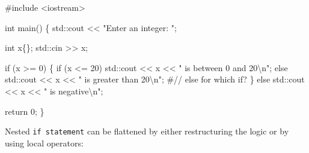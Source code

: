 \documentclass[
  letterpaper,
  DIV=11,
  numbers=noendperiod]{scrreprt}
\newenvironment{Shaded}{\begin{snugshade}}{\end{snugshade}}
\newcommand{\CommentTok}[1]{\textcolor[rgb]{0.37,0.37,0.37}{#1}}
\newcommand{\ControlFlowTok}[1]{\textcolor[rgb]{0.00,0.23,0.31}{#1}}
\newcommand{\DecValTok}[1]{\textcolor[rgb]{0.68,0.00,0.00}{#1}}
\newcommand{\ErrorTok}[1]{\textcolor[rgb]{0.68,0.00,0.00}{#1}}
\newcommand{\FunctionTok}[1]{\textcolor[rgb]{0.28,0.35,0.67}{#1}}
\newcommand{\NormalTok}[1]{\textcolor[rgb]{0.00,0.23,0.31}{#1}}
\newcommand{\SpecialCharTok}[1]{\textcolor[rgb]{0.37,0.37,0.37}{#1}}
\newcommand{\StringTok}[1]{\textcolor[rgb]{0.13,0.47,0.30}{#1}}
\begin{document}
\begin{Shaded}
\begin{Highlighting}[]
\CommentTok{\#include \textless{}iostream\textgreater{}}

\NormalTok{int }\FunctionTok{main}\NormalTok{()}
\NormalTok{\{}
\NormalTok{    std}\SpecialCharTok{::}\NormalTok{cout }\SpecialCharTok{\textless{}}\ErrorTok{\textless{}} \StringTok{"Enter an integer: "}\NormalTok{;}

\NormalTok{    int x\{\};}
\NormalTok{    std}\SpecialCharTok{::}\NormalTok{cin }\SpecialCharTok{\textgreater{}}\ErrorTok{\textgreater{}}\NormalTok{ x;}

    \ControlFlowTok{if}\NormalTok{ (x }\SpecialCharTok{\textgreater{}=} \DecValTok{0}\NormalTok{)}
\NormalTok{    \{}
        \ControlFlowTok{if}\NormalTok{ (x }\SpecialCharTok{\textless{}=} \DecValTok{20}\NormalTok{)}
\NormalTok{            std}\SpecialCharTok{::}\NormalTok{cout }\SpecialCharTok{\textless{}}\ErrorTok{\textless{}}\NormalTok{ x }\SpecialCharTok{\textless{}}\ErrorTok{\textless{}} \StringTok{" is between 0 and 20}\SpecialCharTok{\textbackslash{}n}\StringTok{"}\NormalTok{;}
        \ControlFlowTok{else}\NormalTok{ std}\SpecialCharTok{::}\NormalTok{cout }\SpecialCharTok{\textless{}}\ErrorTok{\textless{}}\NormalTok{ x }\SpecialCharTok{\textless{}}\ErrorTok{\textless{}} \StringTok{" is greater than 20}\SpecialCharTok{\textbackslash{}n}\StringTok{"}\NormalTok{; }\CommentTok{\#// else for which if?}
\NormalTok{    \}}
    \ControlFlowTok{else}
\NormalTok{        std}\SpecialCharTok{::}\NormalTok{cout }\SpecialCharTok{\textless{}}\ErrorTok{\textless{}}\NormalTok{ x }\SpecialCharTok{\textless{}}\ErrorTok{\textless{}} \StringTok{" is negative}\SpecialCharTok{\textbackslash{}n}\StringTok{"}\NormalTok{;}

\NormalTok{    return }\DecValTok{0}\NormalTok{;}
\NormalTok{\}}
\end{Highlighting}
\end{Shaded}

Nested \texttt{if\ statement} can be flattened by either restructuring
the logic or by using local operators:
\end{document}

